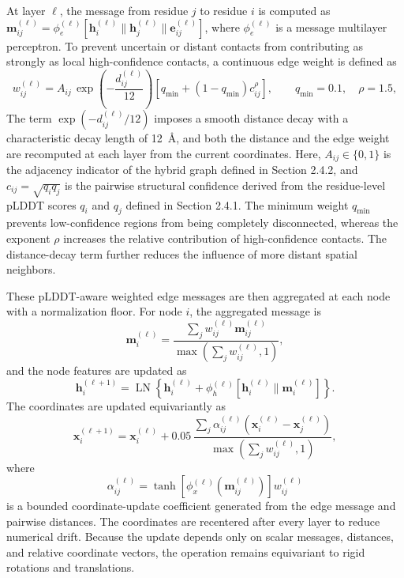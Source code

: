 \documentclass[12pt]{article}
\begin{document}
At layer $\ell$, the message from residue $j$ to residue $i$ is computed as
$\mathbf m_{ij}^{(\ell)} = \phi_e^{(\ell)}[\mathbf h_i^{(\ell)} \parallel
\mathbf h_j^{(\ell)} \parallel \mathbf e_{ij}^{(\ell)}]$, where
$\phi_e^{(\ell)}$ is a message multilayer perceptron. To prevent uncertain or
distant contacts from contributing as strongly as local high-confidence
contacts, a continuous edge weight is defined as
\begin{equation}
    w_{ij}^{(\ell)} = A_{ij}\, \exp\!\left(-\frac{d_{ij}^{(\ell)}}{12}\right)
    \left[q_{\min} + \left(1 - q_{\min}\right) c_{ij}^{\rho}\right],
    \qquad q_{\min} = 0.1, \quad \rho = 1.5,
    \label{eq:edge_weight}
\end{equation}
The term $\exp(-d_{ij}^{(\ell)}/12)$ imposes a smooth distance decay with
a characteristic decay length of 12~\AA{}, and both the distance and the edge
weight are recomputed at each layer from the current coordinates. Here,
$A_{ij} \in \{0,1\}$ is the adjacency indicator of the hybrid graph defined
in Section 2.4.2, and $c_{ij} = \sqrt{q_i q_j}$ is the pairwise structural
confidence derived from the residue-level pLDDT scores $q_i$ and $q_j$
defined in Section 2.4.1. The minimum weight $q_{\min}$ prevents
low-confidence regions from being completely disconnected, whereas the
exponent $\rho$ increases the relative contribution of high-confidence
contacts. The distance-decay term further reduces the influence of more
distant spatial neighbors.

These pLDDT-aware weighted edge messages are then aggregated at each node
with a normalization floor. For node $i$, the aggregated message is
\begin{equation}
    \mathbf m_i^{(\ell)} =
    \frac{\sum_j w_{ij}^{(\ell)}\mathbf m_{ij}^{(\ell)}}
    {\max\!\left(\sum_j w_{ij}^{(\ell)}, 1\right)},
    \label{eq:aggregated_message}
\end{equation}
and the node features are updated as
\begin{equation}
    \mathbf h_i^{(\ell+1)} = \operatorname{LN}\!\left\{
    \mathbf h_i^{(\ell)} + \phi_h^{(\ell)}\!\left[
    \mathbf h_i^{(\ell)} \parallel \mathbf m_i^{(\ell)}\right]\right\}.
    \label{eq:node_feature_update}
\end{equation}
The coordinates are updated equivariantly as
\begin{equation}
    \mathbf x_i^{(\ell+1)} = \mathbf x_i^{(\ell)} +
    0.05\,
    \frac{\sum_j \alpha_{ij}^{(\ell)}
    \left(\mathbf x_i^{(\ell)} - \mathbf x_j^{(\ell)}\right)}
    {\max\!\left(\sum_j w_{ij}^{(\ell)}, 1\right)},
    \label{eq:coordinate_update}
\end{equation}
where
\begin{equation}
    \alpha_{ij}^{(\ell)} =
    \tanh\!\left[\phi_x^{(\ell)}\!\left(\mathbf m_{ij}^{(\ell)}\right)\right]
    w_{ij}^{(\ell)}
    \label{eq:coordinate_coefficient}
\end{equation}
is a bounded coordinate-update coefficient generated from the edge message
and pairwise distances. The
coordinates are recentered after every layer to reduce numerical drift.
Because the update depends only on scalar messages, distances, and relative
coordinate vectors, the operation remains equivariant to rigid rotations and
translations.
\end{document}
